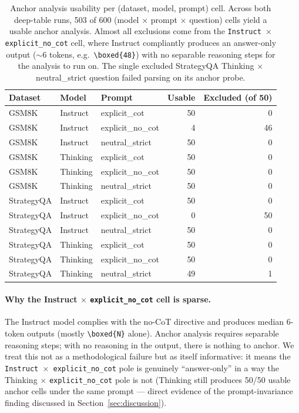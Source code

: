 \documentclass{article}
\theoremstyle{plain}
\theoremstyle{definition}
\theoremstyle{remark}
\begin{document}
\begin{table}[h]
\centering
\small
\begin{tabular}{lllrr}
\toprule
Dataset & Model & Prompt & Usable & Excluded (of 50) \\
\midrule
GSM8K       & Instruct & explicit\_cot     & 50 & 0 \\
GSM8K       & Instruct & explicit\_no\_cot &  4 & 46 \\
GSM8K       & Instruct & neutral\_strict   & 50 & 0 \\
GSM8K       & Thinking & explicit\_cot     & 50 & 0 \\
GSM8K       & Thinking & explicit\_no\_cot & 50 & 0 \\
GSM8K       & Thinking & neutral\_strict   & 50 & 0 \\
\midrule
StrategyQA  & Instruct & explicit\_cot     & 50 & 0 \\
StrategyQA  & Instruct & explicit\_no\_cot &  0 & 50 \\
StrategyQA  & Instruct & neutral\_strict   & 50 & 0 \\
StrategyQA  & Thinking & explicit\_cot     & 50 & 0 \\
StrategyQA  & Thinking & explicit\_no\_cot & 50 & 0 \\
StrategyQA  & Thinking & neutral\_strict   & 49 & 1 \\
\bottomrule
\end{tabular}
\caption{Anchor analysis usability per (dataset, model, prompt)
cell. Across both deep-table runs, 503 of 600 (model $\times$
prompt $\times$ question) cells yield a usable anchor analysis.
Almost all exclusions come from the \texttt{Instruct $\times$
explicit\_no\_cot} cell, where Instruct compliantly produces an
answer-only output ($\sim$6 tokens, e.g.\ \texttt{\textbackslash boxed\{48\}}) with no separable
reasoning steps for the analysis to run on. The single excluded
StrategyQA Thinking $\times$ neutral\_strict question failed
parsing on its anchor probe.}
\label{tab:anchor-coverage}
\end{table}

\paragraph{Why the Instruct $\times$ \texttt{explicit\_no\_cot} cell
is sparse.} The Instruct model complies with the no-CoT directive
and produces median 6-token outputs (mostly \texttt{\textbackslash boxed\{N\}} alone).
Anchor analysis requires separable reasoning steps; with no reasoning
in the output, there is nothing to anchor. We treat this not as a
methodological failure but as itself informative: it means the
\texttt{Instruct $\times$ \texttt{explicit\_no\_cot}} pole is genuinely
``answer-only'' in a way the Thinking $\times$ \texttt{explicit\_no\_cot}
pole is not (Thinking still produces 50/50 usable anchor cells under
the same prompt --- direct evidence of the prompt-invariance finding
discussed in Section~\ref{sec:discussion}).
\end{document}
